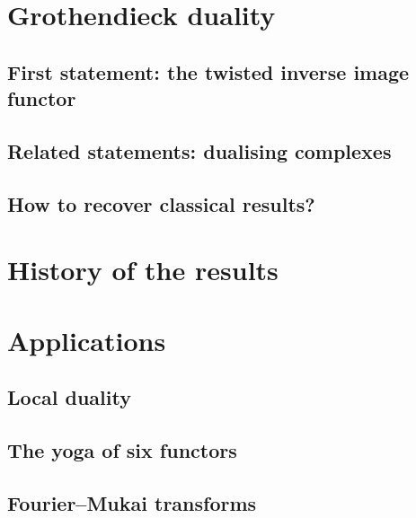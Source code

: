 \documentclass[10pt,a4paper]{article}
\begin{document}
\section{Grothendieck duality}
\label{section:grothendieck-duality}
\subsection{First statement: the twisted inverse image functor}
\label{subsection:first-statement}

\subsection{Related statements: dualising complexes}
\label{subsection:related-statements}

\subsection{How to recover classical results?}
\label{subsection:classical-results}


\section{History of the results}
\label{section:history}


\section{Applications}
\label{section:applications}
\subsection{Local duality}
\label{subsection:local-duality}

\subsection{The yoga of six functors}
\label{subsection:six-functors-yoga}

\subsection{Fourier--Mukai transforms}
\label{subsection:fourier-mukai-transforms}




\printbibliography
\end{document}
